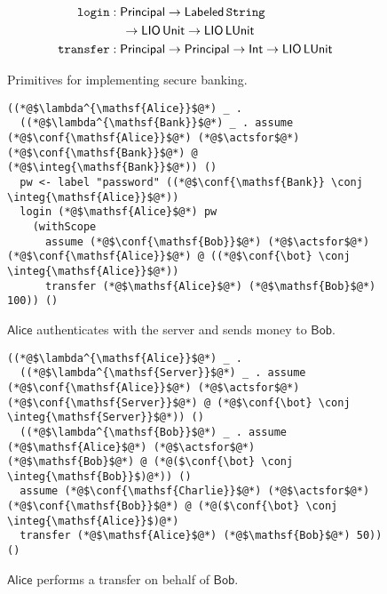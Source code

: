 \begin{figure}
    \centering
    \begin{align*}
\mathtt{login}&: \mathsf{Principal} \to \mathsf{Labeled}\,\mathtt{String} \\ &\quad \to \mathsf{LIO}\,\mathsf{Unit} \to \mathsf{LIO}\,\mathsf{LUnit}\\
\mathtt{transfer}&: \mathsf{Principal} \to \mathsf{Principal} \to \mathsf{Int} \to \mathsf{LIO}\,\mathsf{LUnit}
\end{align*}
    \caption{Primitives for implementing secure banking.}
    \label{fig:sec-banking-sigs}
\end{figure}

\begin{figure}
\centering
\begin{lstlisting}
((*@$\lambda^{\mathsf{Alice}}$@*) _ .
  ((*@$\lambda^{\mathsf{Bank}}$@*) _ . assume (*@$\conf{\mathsf{Alice}}$@*) (*@$\actsfor$@*) (*@$\conf{\mathsf{Bank}}$@*) @ (*@$\integ{\mathsf{Bank}}$@*)) ()
  pw <- label "password" ((*@$\conf{\mathsf{Bank}} \conj \integ{\mathsf{Alice}}$@*))
  login (*@$\mathsf{Alice}$@*) pw
    (withScope
      assume (*@$\conf{\mathsf{Bob}}$@*) (*@$\actsfor$@*) (*@$\conf{\mathsf{Alice}}$@*) @ ((*@$\conf{\bot} \conj \integ{\mathsf{Alice}}$@*))
      transfer (*@$\mathsf{Alice}$@*) (*@$\mathsf{Bob}$@*) 100)) ()
\end{lstlisting}
\caption{$\mathsf{Alice}$ authenticates with the server and sends money to $\mathsf{Bob}$.}
\label{fig:sec-bank-alice-send-to-bob}
\end{figure}

\begin{figure}
\centering
\begin{lstlisting}
((*@$\lambda^{\mathsf{Alice}}$@*) _ .
  ((*@$\lambda^{\mathsf{Server}}$@*) _ . assume (*@$\conf{\mathsf{Alice}}$@*) (*@$\actsfor$@*) (*@$\conf{\mathsf{Server}}$@*) @ (*@$\conf{\bot} \conj \integ{\mathsf{Server}}$@*)) ()
  ((*@$\lambda^{\mathsf{Bob}}$@*) _ . assume (*@$\mathsf{Alice}$@*) (*@$\actsfor$@*) (*@$\mathsf{Bob}$@*) @ (*@($\conf{\bot} \conj \integ{\mathsf{Bob}}$)@*)) ()
  assume (*@$\conf{\mathsf{Charlie}}$@*) (*@$\actsfor$@*) (*@$\conf{\mathsf{Bob}}$@*) @ (*@($\conf{\bot} \conj \integ{\mathsf{Alice}}$)@*)
  transfer (*@$\mathsf{Alice}$@*) (*@$\mathsf{Bob}$@*) 50)) ()
\end{lstlisting}
\caption{$\mathsf{Alice}$ performs a transfer on behalf of $\mathsf{Bob}$.}
\label{fig:sec-bank-alice-banks-for-bob}
\end{figure}

